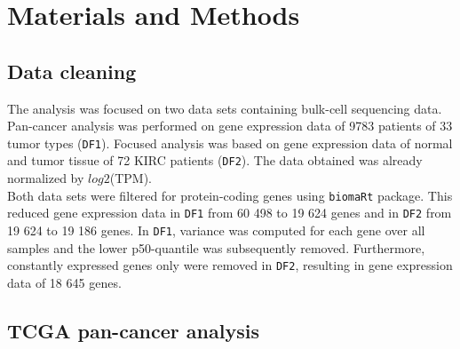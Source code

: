 \documentclass[
  parskip,
  oneside]{scrreprt}
\begin{document}
\hypertarget{materials-and-methods}{%
\chapter{Materials and Methods}\label{materials-and-methods}}

\hypertarget{data-cleaning}{%
\section{Data cleaning}\label{data-cleaning}}

The analysis was focused on two data sets containing bulk-cell
sequencing data. Pan-cancer analysis was performed on gene expression
data of 9783 patients of 33 tumor types (\texttt{DF1}). Focused analysis
was based on gene expression data of normal and tumor tissue of 72 KIRC
patients (\texttt{DF2}). The data obtained was already normalized by
\(log2\)(TPM).\\
Both data sets were filtered for protein-coding genes using
\texttt{biomaRt} package. This reduced gene expression data in
\texttt{DF1} from 60 498 to 19 624 genes and in \texttt{DF2} from 19 624
to 19 186 genes. In \texttt{DF1}, variance was computed for each gene
over all samples and the lower p50-quantile was subsequently removed.
Furthermore, constantly expressed genes only were removed in
\texttt{DF2}, resulting in gene expression data of 18 645 genes.

\hypertarget{tcga-pan-cancer-analysis}{%
\section{TCGA pan-cancer analysis}\label{tcga-pan-cancer-analysis}}
\end{document}
